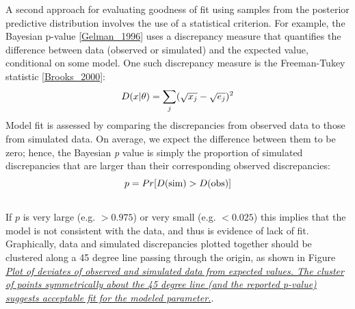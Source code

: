 \documentclass[letterpaper,10pt,english]{sphinxmanual}
\begin{document}
A second approach for evaluating goodness of fit using samples from the posterior predictive distribution involves the use of a statistical criterion. For example, the Bayesian p-value {\hyperref[references:gelman-1996]{{[}Gelman\_1996{]}}} uses a discrepancy measure that quantifies the difference between data (observed or simulated) and the expected value, conditional on some model. One such discrepancy measure is the Freeman-Tukey statistic {\hyperref[references:brooks-2000]{{[}Brooks\_2000{]}}}:
\begin{gather}
\begin{split}D(x|\theta) = \sum_j (\sqrt{x_j}-\sqrt{e_j})^2\end{split}\notag
\end{gather}
Model fit is assessed by comparing the discrepancies from observed data to those from simulated data. On average, we expect the difference between them to be zero; hence, the Bayesian \emph{p} value is simply the proportion of simulated discrepancies that are larger than their corresponding observed discrepancies:
\begin{gather}
\begin{split}p = Pr[ D(\text{sim}) > D(\text{obs}) ]\end{split}\notag\\\begin{split}\end{split}\notag
\end{gather}
If $p$ is very large (e.g. $>0.975$) or very small (e.g. $<0.025$) this implies that the model is not consistent with the data, and thus is evidence of lack of fit. Graphically, data and simulated discrepancies plotted together should be clustered along a 45 degree line passing through the origin, as shown in Figure {\hyperref[modelchecking:deviate]{\emph{Plot of deviates of observed and simulated data from expected values.
The cluster of points symmetrically about the 45 degree line (and the
reported p-value) suggests acceptable fit for the modeled parameter.}}}.
\end{document}
